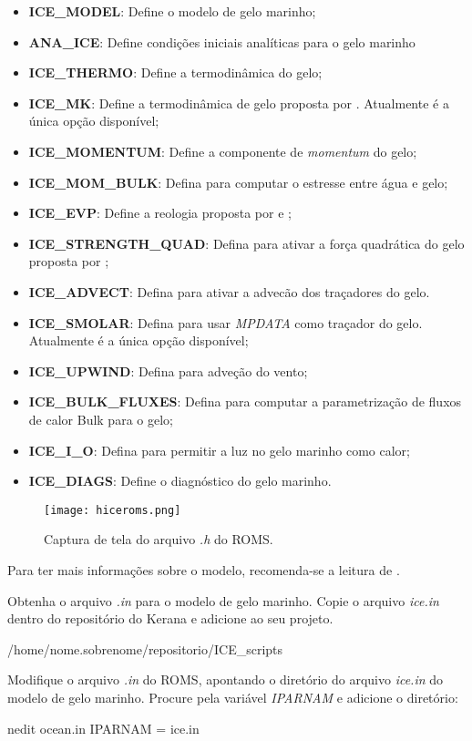 \begin{itemize}
    \item \textbf{ICE\_MODEL}: Define o modelo de gelo marinho;
    \item \textbf{ANA\_ICE}: Define condições iniciais analíticas para o gelo marinho 
    \item \textbf{ICE\_THERMO}: Define a termodinâmica do gelo;  
    \item \textbf{ICE\_MK}: Define a termodinâmica de gelo proposta por \textcite{Mellor1989}. Atualmente é a única opção disponível;
    \item \textbf{ICE\_MOMENTUM}: Define a componente de \textit{momentum} do gelo;
    \item \textbf{ICE\_MOM\_BULK}: Defina para computar o estresse entre água e gelo;
    \item \textbf{ICE\_EVP}: Define a reologia proposta por \textcite{Hunke1997} e \textcite{Hunke2001};
    \item \textbf{ICE\_STRENGTH\_QUAD}: Defina para ativar a força quadrática do gelo proposta por \textcite{Overland1988};
    \item \textbf{ICE\_ADVECT}: Defina para ativar a advecão dos traçadores do gelo.
    \item \textbf{ICE\_SMOLAR}: Defina para usar \textit{MPDATA} como traçador do gelo. Atualmente é a única opção disponível;   
    \item \textbf{ICE\_UPWIND}: Defina para adveção do vento;
    \item \textbf{ICE\_BULK\_FLUXES}: Defina para computar a parametrização de fluxos de calor Bulk para o gelo;
    \item \textbf{ICE\_I\_O}: Defina para permitir a luz no gelo marinho como calor;
    \item \textbf{ICE\_DIAGS}: Define o diagnóstico do gelo marinho.
\end{itemize}
\bigskip

\begin{figure}[H]
    \centering
    \texttt{[image: hiceroms.png]}
    \caption{Captura de tela do arquivo \textit{.h} do ROMS.}
    \label{hiceroms}
\end{figure}
\bigskip

\noindent Para ter mais informações sobre o modelo, recomenda-se a leitura de \textcite{hedstrom2018}.
\bigskip

\noindent Obtenha o arquivo \textit{.in} para o modelo de gelo marinho. Copie o arquivo \textit{ice.in} dentro do repositório do Kerana e adicione ao seu projeto.
\bigskip

\begin{bashcode}
    /home/nome.sobrenome/repositorio/ICE_scripts
\end{bashcode}
\bigskip
    
\noindent Modifique o arquivo \textit{.in} do ROMS, apontando o diretório do arquivo \textit{ice.in} do modelo de gelo marinho. Procure pela variável \textit{IPARNAM} e adicione o diretório:
\bigskip

\begin{bashcode}
nedit ocean.in
IPARNAM =  ice.in
\end{bashcode}

